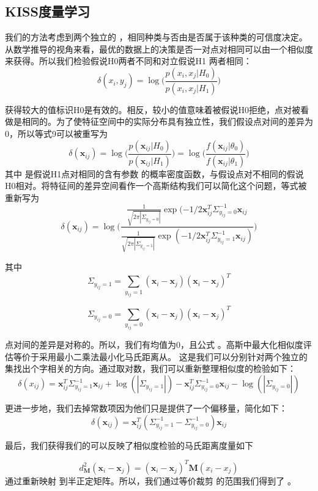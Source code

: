 \subsection{KISS度量学习}
我们的方法考虑到两个独立的                    ，相同种类与否由\cite{ma2014covariance}是否属于该种类的可信度决定。从数学推导的视角来看，最优的数据上的决策是否一对点对相同可以由一个相似度来获得。所以我们检验假说H0两者不同和对立假说H1 两者相同：
$$\delta(x_{i},y_{j}) = \log\bigg(\frac{p(x_{i},x_{j}|H_{0})}{p(x_{i},x_{j}|H_{1})}\bigg)$$

获得较大的值标识H0是有效的。相反，较小的值意味着被假说H0拒绝，点对被看做是相同的。为了使特征空间中的实际分布具有独立性，我们假设点对间的差异为0，所以等式9可以被重写为
$$\delta(\mathbf x_{ij}) = \log \bigg(\frac{p(\mathbf x_{ij}|H_{0})}{p(\mathbf x_{ij}|H_{1})}\bigg) = \log\bigg(\frac{f(\mathbf x_{ij}|\theta_{0})}{f(\mathbf x_{ij}|\theta_{1})}\bigg)$$
其中   是假说H1点对相同的含有参数  的概率密度函数，与假设点对不相同的假说H0相对。将特征间的差异空间看作一个高斯结构我们可以简化这个问题，等式被重新写为
$$\delta(\mathbf x_{ij}) = \log \Bigg(\frac{\frac{1}{\sqrt{2\pi|\Sigma_{y_{ij}=0}|}}\exp(-1/2 \mathbf x_{ij}^T \Sigma_{y_{ij}=0}^{-1}\mathbf x_{ij}}{\frac{1}{\sqrt{2 \pi |\Sigma_{y_{ij}=1}|}}\exp(-1/2 \mathbf x_{ij}^{T}\Sigma_{y_{ij}=1}^{-1} \mathbf x_{ij})}\Bigg)$$

其中
$$\Sigma_{y_{ij}=1} = \sum_{y_{ij} = 1}(\mathbf x_{i} - \mathbf x_{j})(\mathbf x_{i} - \mathbf x_{j})^{T}$$

$$\Sigma_{y_{ij}=0} = \sum_{y_{ij} = 0}(\mathbf x_{i} - \mathbf x_{j})(\mathbf x_{i} - \mathbf x_{j})^{T}$$

点对间的差异是对称的。所以，我们有均值为0，且公式  。高斯中最大化相似度评估等价于采用最小二乘法最小化马氏距离从。 这是我们可以分别针对两个独立的集找出个字相关的方向。通过取对数，我们可以重新整理相似度的检验如下：
$$\delta(x_{ij})= \mathbf x_{ij}^{T}\Sigma_{y_{ij}=1}^{-1}\mathbf x_{ij} + \log(|\Sigma_{y_{ij}=1}|) - \mathbf x_{ij}^{T}\Sigma_{y_{ij}=0}^{-1}\mathbf x_{ij} - \log(|\Sigma_{y_{ij}=0}|)$$

更进一步地，我们去掉常数项因为他们只是提供了一个偏移量，简化如下：
$$\delta (\mathbf x_{ij})=\mathbf x_{ij}^{T}(\Sigma_{y_{ij}=1}^{-1}-\Sigma_{y_{ij}=0}^{-1})\mathbf x_{ij}$$


最后，我们获得我们的可以反映了相似度检验的马氏距离度量如下

$$d_{\mathbf M}^2(\mathbf x_{i} - \mathbf x_{j}) = (\mathbf x_{i} - \mathbf x_{j})^{T} \mathbf M (x_{i}-x_{j})$$
通过重新映射     到半正定矩阵。所以，我们通过等价裁剪  的范围我们得到了   。


